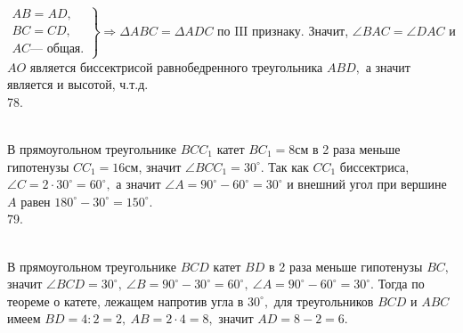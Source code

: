 \documentclass[12pt]{article}
\begin{document}
$\left.\begin{array}{l}AB=AD,\\
BC=CD,\\
AC\text{--- общая.}  \end{array}\right\}\Rightarrow \Delta ABC=\Delta ADC\text{ по III признаку.}$ Значит, $\angle BAC=\angle DAC$ и $AO$ является биссектрисой равнобедренного треугольника $ABD,$ а значит является и высотой, ч.т.д.\\
78. \begin{figure}[ht!]
\end{figure}\\
В прямоугольном треугольнике $BCC_1$ катет $BC_1=8$см в 2 раза меньше гипотенузы $CC_1=16$см, значит $\angle BCC_1=30^\circ.$ Так как $CC_1$ биссектриса, $\angle C=2\cdot30^\circ=60^\circ,$ а значит $\angle A=90^\circ-60^\circ=30^\circ$ и внешний угол при вершине $A$ равен $180^\circ-30^\circ=150^\circ.$\\
79. \begin{figure}[ht!]
\end{figure}\\
В прямоугольном треугольнике $BCD$ катет $BD$ в 2 раза меньше гипотенузы $BC,$ значит $\angle BCD=30^\circ,\ \angle B=90^\circ-30^\circ=60^\circ,\ \angle A=90^\circ-60^\circ=30^\circ.$ Тогда по теореме о катете, лежащем напротив угла в $30^\circ,$ для треугольников $BCD$ и $ABC$ имеем $BD=4:2=2,\ AB=2\cdot4=8,$ значит  $AD=8-2=6.$\\
\end{document}
